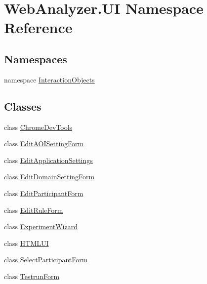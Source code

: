 \hypertarget{namespace_web_analyzer_1_1_u_i}{}\section{Web\+Analyzer.\+U\+I Namespace Reference}
\label{namespace_web_analyzer_1_1_u_i}
\subsection*{Namespaces}
\begin{DoxyCompactItemize}
\item 
namespace \hyperlink{namespace_web_analyzer_1_1_u_i_1_1_interaction_objects}{Interaction\+Objects}
\end{DoxyCompactItemize}
\subsection*{Classes}
\begin{DoxyCompactItemize}
\item 
class \hyperlink{class_web_analyzer_1_1_u_i_1_1_chrome_dev_tools}{Chrome\+Dev\+Tools}
\item 
class \hyperlink{class_web_analyzer_1_1_u_i_1_1_edit_a_o_i_setting_form}{Edit\+A\+O\+I\+Setting\+Form}
\item 
class \hyperlink{class_web_analyzer_1_1_u_i_1_1_edit_application_settings}{Edit\+Application\+Settings}
\item 
class \hyperlink{class_web_analyzer_1_1_u_i_1_1_edit_domain_setting_form}{Edit\+Domain\+Setting\+Form}
\item 
class \hyperlink{class_web_analyzer_1_1_u_i_1_1_edit_participant_form}{Edit\+Participant\+Form}
\item 
class \hyperlink{class_web_analyzer_1_1_u_i_1_1_edit_rule_form}{Edit\+Rule\+Form}
\item 
class \hyperlink{class_web_analyzer_1_1_u_i_1_1_experiment_wizard}{Experiment\+Wizard}
\item 
class \hyperlink{class_web_analyzer_1_1_u_i_1_1_h_t_m_l_u_i}{H\+T\+M\+L\+U\+I}
\item 
class \hyperlink{class_web_analyzer_1_1_u_i_1_1_select_participant_form}{Select\+Participant\+Form}
\item 
class \hyperlink{class_web_analyzer_1_1_u_i_1_1_testrun_form}{Testrun\+Form}
\end{DoxyCompactItemize}
